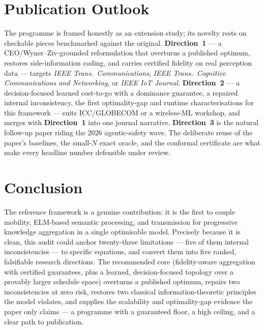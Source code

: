 \documentclass[11pt,a4paper]{article}
\newcommand{\Dir}[1]{\textcolor{accent}{\textbf{Direction~#1}}}
\begin{document}
\section{Publication Outlook}
The programme is framed honestly as an extension study; its novelty rests on checkable pieces benchmarked against the original. \Dir{1} --- a CEO/Wyner--Ziv-grounded reformulation that overturns a published optimum, restores side-information coding, and carries certified fidelity on real perception data --- targets \emph{IEEE Trans.\ Communications}, \emph{IEEE Trans.\ Cognitive Communications and Networking}, or \emph{IEEE IoT Journal}. \Dir{2} --- a decision-focused learned cost-to-go with a dominance guarantee, a repaired internal inconsistency, the first optimality-gap and runtime characterisations for this framework --- suits ICC/GLOBECOM or a wireless-ML workshop, and merges with \Dir{1} into one journal narrative. \Dir{3} is the natural follow-up paper riding the 2026 agentic-safety wave. The deliberate reuse of the paper's baselines, the small-$N$ exact oracle, and the conformal certificate are what make every headline number defensible under review.

\section{Conclusion}
The reference framework is a genuine contribution: it is the first to couple mobility, ELM-based semantic processing, and transmission for progressive knowledge aggregation in a single optimisable model. Precisely because it is clean, this audit could anchor twenty-three limitations --- five of them internal inconsistencies --- to specific equations, and convert them into five ranked, falsifiable research directions. The recommended core (fidelity-aware aggregation with certified guarantees, plus a learned, decision-focused topology over a provably larger schedule space) overturns a published optimum, repairs two inconsistencies at zero risk, restores two classical information-theoretic principles the model violates, and supplies the scalability and optimality-gap evidence the paper only claims --- a programme with a guaranteed floor, a high ceiling, and a clear path to publication.
\end{document}
